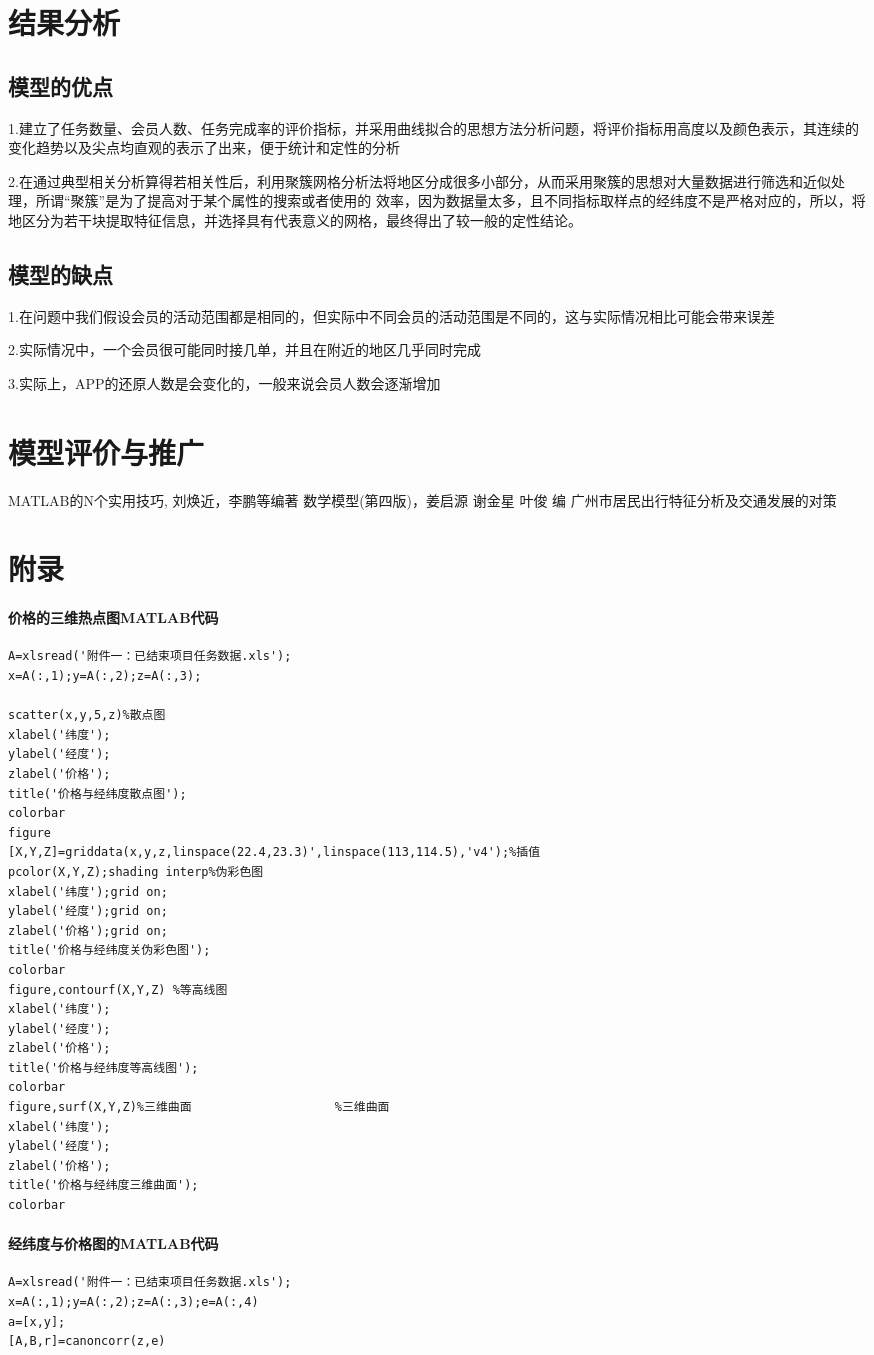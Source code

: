 \documentclass{ctexart}
\begin{document}
\section{结果分析}
\subsection{模型的优点}
1.建立了任务数量、会员人数、任务完成率的评价指标，并采用曲线拟合的思想方法分析问题，将评价指标用高度以及颜色表示，其连续的变化趋势以及尖点均直观的表示了出来，便于统计和定性的分析

2.在通过典型相关分析算得若相关性后，利用聚簇网格分析法将地区分成很多小部分，从而采用聚簇的思想对大量数据进行筛选和近似处理，所谓“聚簇”是为了提高对于某个属性的搜索或者使用的 效率，因为数据量太多，且不同指标取样点的经纬度不是严格对应的，所以，将地区分为若干块提取特征信息，并选择具有代表意义的网格，最终得出了较一般的定性结论。


\subsection{模型的缺点}
1.在问题中我们假设会员的活动范围都是相同的，但实际中不同会员的活动范围是不同的，这与实际情况相比可能会带来误差

2.实际情况中，一个会员很可能同时接几单，并且在附近的地区几乎同时完成

3.实际上，APP的还原人数是会变化的，一般来说会员人数会逐渐增加
\section{模型评价与推广}
\newpage  
\appendix 
\begin{thebibliography}{9}
 MATLAB的N个实用技巧, 刘焕近，李鹏等编著
 数学模型(第四版)，姜启源 谢金星 叶俊 编
 广州市居民出行特征分析及交通发展的对策
\end{thebibliography}
\section{附录}
\paragraph{价格的三维热点图MATLAB代码}
\begin{verbatim}
A=xlsread('附件一：已结束项目任务数据.xls');
x=A(:,1);y=A(:,2);z=A(:,3);

scatter(x,y,5,z)%散点图
xlabel('纬度');
ylabel('经度');
zlabel('价格');
title('价格与经纬度散点图');
colorbar
figure
[X,Y,Z]=griddata(x,y,z,linspace(22.4,23.3)',linspace(113,114.5),'v4');%插值
pcolor(X,Y,Z);shading interp%伪彩色图
xlabel('纬度');grid on;
ylabel('经度');grid on;
zlabel('价格');grid on;
title('价格与经纬度关伪彩色图');
colorbar
figure,contourf(X,Y,Z) %等高线图
xlabel('纬度');
ylabel('经度');
zlabel('价格');
title('价格与经纬度等高线图');
colorbar
figure,surf(X,Y,Z)%三维曲面                    %三维曲面
xlabel('纬度');
ylabel('经度');
zlabel('价格');
title('价格与经纬度三维曲面');
colorbar
\end{verbatim}
\paragraph{经纬度与价格图的MATLAB代码}
\begin{verbatim}
A=xlsread('附件一：已结束项目任务数据.xls');
x=A(:,1);y=A(:,2);z=A(:,3);e=A(:,4)
a=[x,y];
[A,B,r]=canoncorr(z,e)
\end{verbatim}
\end{document}
